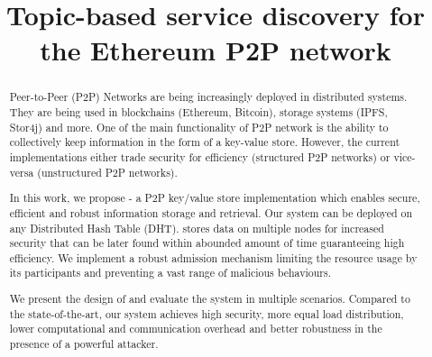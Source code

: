 \documentclass[sigconf]{acmart}
\begin{document}
\title{Topic-based service discovery for the Ethereum P2P network}
\author{}


\begin{abstract}
Peer-to-Peer (P2P) Networks  are being increasingly deployed in distributed systems. They are being used in blockchains (Ethereum, Bitcoin), storage systems (IPFS, Stor4j) and more. One of the main functionality of P2P network is the ability to collectively keep information in the form of a key-value store. However, the current implementations either trade security for efficiency (structured P2P networks) or vice-versa (unstructured P2P networks). 

In this work, we propose \sysname - a P2P key/value store implementation which enables secure, efficient and robust information storage and retrieval. Our system can be deployed on any Distributed Hash Table (DHT). \sysname stores data on multiple nodes for increased security that can be later found within abounded amount of time guaranteeing high efficiency. We implement a robust admission mechanism limiting the resource usage by its participants and preventing a vast range of malicious behaviours. 

We present the design of \sysname and evaluate the system in multiple scenarios. Compared to the state-of-the-art, our system achieves high security, more equal load distribution, lower computational and communication overhead and better robustness in the presence of a powerful attacker.



\end{abstract}
\end{document}

